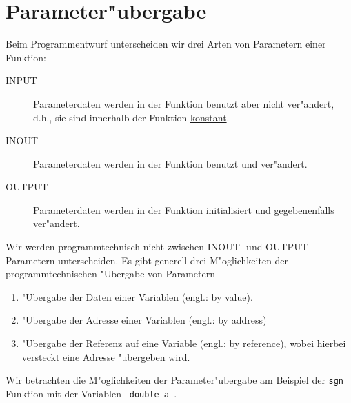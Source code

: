 \section{Parameter"ubergabe}
\label{p:7.2}
%
Beim Programmentwurf unterscheiden wir drei Arten von Parametern einer
Funktion:
\begin{description}
 \item[INPUT] Parameterdaten werden in der Funktion benutzt aber nicht ver"andert,
 	d.h., sie sind innerhalb der Funktion \underline{konstant}.
 \item[INOUT] Parameterdaten werden in der Funktion benutzt und ver"andert.
 \item[OUTPUT] Parameterdaten werden in der Funktion initialisiert
 	und gegebenenfalls ver"andert.
\end{description}
Wir werden programmtechnisch nicht zwischen INOUT-  und OUTPUT-Parametern
unterscheiden.
%
Es gibt generell drei M"oglichkeiten
der programmtechnischen "Ubergabe von Parametern
\begin{enumerate}
  \item "Ubergabe der Daten einer Variablen (engl.: by value).
  \item "Ubergabe der Adresse einer Variablen (engl.: by address)
  \item "Ubergabe der Referenz auf eine Variable (engl.: by reference),
  	wobei hierbei versteckt eine Adresse "ubergeben wird.
\end{enumerate}
%
%
Wir betrachten die M"oglichkeiten der Parameter"ubergabe
 am Beispiel der \verb|sgn| Funktion mit der Variablen
\verb| double a |.
